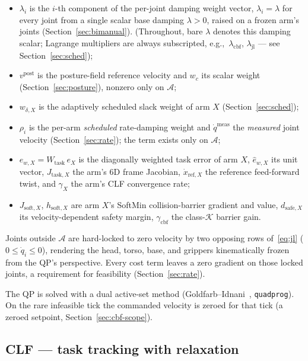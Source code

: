 \documentclass[12pt,a4paper,twoside,openright]{report}
\newcommand{\qdot}{\dot{q}}
\begin{document}
\begin{itemize}[nosep]
\item $\lambda_i$ is the $i$-th component of the per-joint damping weight vector, $\lambda_i = \lambda$ for every joint from a single scalar base damping $\lambda > 0$, raised on a frozen arm's joints (Section~\ref{sec:bimanual}). (Throughout, bare $\lambda$ denotes this damping scalar; Lagrange multipliers are always subscripted, e.g.,\ $\lambda_{\text{cbf}}$, $\lambda_{\text{jl}}$ --- see Section~\ref{sec:sched});
\item $v^{\text{post}}$ is the posture-field reference velocity and $w_c$ its scalar weight (Section~\ref{sec:posture}), nonzero only on $\mathcal{A}$;
\item $w_{\delta,X}$ is the adaptively scheduled slack weight of arm $X$ (Section~\ref{sec:sched});
\item $\rho_i$ is the per-arm \emph{scheduled} rate-damping weight and $\qdot^{\text{meas}}$ the \emph{measured} joint velocity (Section~\ref{sec:rate}); the term exists only on $\mathcal{A}$;
\item $e_{w,X} = W_{\text{task}}\,e_X$ is the diagonally weighted task error of arm $X$, $\hat{e}_{w,X}$ its unit vector, $J_{\text{task},X}$ the arm's 6D frame Jacobian, $\dot{x}_{\text{ref},X}$ the reference feed-forward twist, and $\gamma_X$ the arm's CLF convergence rate;
\item $J_{\text{soft},X}$, $h_{\text{soft},X}$ are arm $X$'s SoftMin collision-barrier gradient and value, $d_{\text{safe},X}$ its velocity-dependent safety margin, $\gamma_{\text{cbf}}$ the class-$\mathcal{K}$ barrier gain.
\end{itemize}
Joints outside $\mathcal{A}$ are hard-locked to zero velocity by two opposing rows of~\eqref{eq:jl} ($0 \le \qdot_i \le 0$), rendering the head, torso, base, and grippers kinematically frozen from the QP's perspective. Every cost term leaves a zero gradient on those locked joints, a requirement for feasibility (Section~\ref{sec:rate}).

The QP is solved with a dual active-set method (Goldfarb--Idnani~\cite{goldfarb1983}, \texttt{quadprog}). On the rare infeasible tick the commanded velocity is zeroed for that tick (a zeroed setpoint, Section~\ref{sec:cbf-scope}).

\subsection{CLF --- task tracking with relaxation}
\label{sec:clf}
\end{document}
